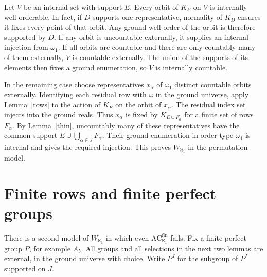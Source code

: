 \documentclass[11pt]{article}
\begin{document}
Let $V$ be an internal set with support $E$. Every orbit of $K_E$ on $V$ is internally well-orderable. In fact, if $D$ supports one representative, normality of $K_D$ ensures it fixes every point of that orbit. Any ground well-order of the orbit is therefore supported by $D$. If any orbit is uncountable externally, it supplies an internal injection from $\omega_1$. If all orbits are countable and there are only countably many of them externally, $V$ is countable externally. The union of the supports of its elements then fixes a ground enumeration, so $V$ is internally countable.

In the remaining case choose representatives $x_\alpha$ of $\omega_1$ distinct countable orbits externally. Identifying each residual row with $\omega$ in the ground universe, apply Lemma~\ref{rows} to the action of $K_E$ on the orbit of $x_\alpha$. The residual index set injects into the ground reals. Thus $x_\alpha$ is fixed by $K_{E\cup F_\alpha}$ for a finite set of rows $F_\alpha$. By Lemma~\ref{thin}, uncountably many of these representatives have the common support $E\cup\bigcup_{\alpha\in J}F_\alpha$. Their ground enumeration in order type $\omega_1$ is internal and gives the required injection. This proves $W_{\aleph_1}$ in the permutation model.

\section{Finite rows and finite perfect groups}\label{perfectsec}
There is a second model of $W_{\aleph_1}$ in which even $\mathrm{AC}_{\aleph_1}^{\mathrm{fin}}$ fails. Fix a finite perfect group $P$, for example $A_5$. All groups and all selections in the next two lemmas are external, in the ground universe with choice. Write $P^J$ for the subgroup of $P^I$ supported on $J$.
\end{document}
